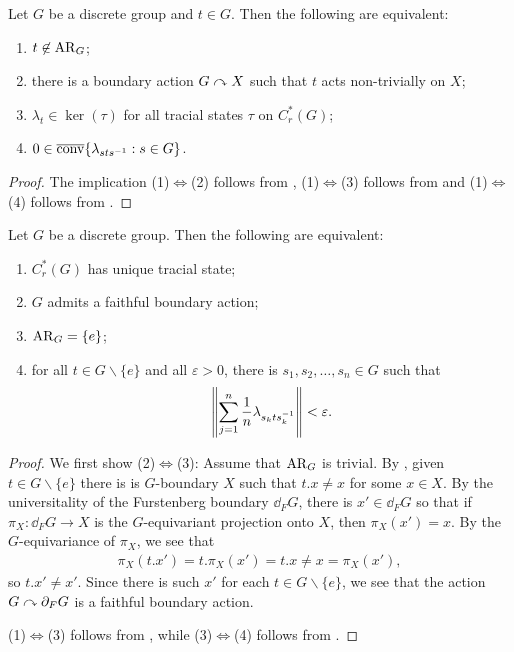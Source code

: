 \begin{theorem}
Let $G$ be a discrete group and $t \in G$. Then the following are equivalent:
\begin{enumerate}
\item $t \not\in \operatorname{AR}_G$;
\item there is a boundary action $G \curvearrowright X$ such that $t$ acts non-trivially on $X$;
\item $\lambda_t \in \ker(\tau)$ for all tracial states $\tau$ on $C_r^*(G)$;
\item $0 \in \overline{\operatorname{conv}}\{\lambda_{sts^{-1}} : s \in G \}$.
\end{enumerate}
\begin{proof}
The implication (1)$\Leftrightarrow$(2) follows from , (1)$\Leftrightarrow$(3) follows from  and (1)$\Leftrightarrow$(4) follows from .
\end{proof}
\end{theorem}

\begin{theorem}\label{trace unique arg triv}
Let $G$ be a discrete group. Then the following are equivalent:
\begin{enumerate}
\item $C_r^*(G)$ has unique tracial state;
\item $G$ admits a faithful boundary action;
\item $\operatorname{AR}_G = \{ e \}$;
\item for all $t \in G \backslash \{e\}$ and all $\varepsilon>0$, there is $s_1,s_2,\dots,s_n \in G$ such that
\begin{align*}
\left\lVert \sum_{j=1}^n \frac{1}{n} \lambda_{s_k t s_k ^{-1}} \right\rVert < \varepsilon.
\end{align*}
\end{enumerate}
\begin{proof}
We first show (2)$\Leftrightarrow$(3): Assume that $\operatorname{AR}_G$ is trivial. By , given $t \in G\backslash \{e\}$ there is is $G$-boundary $X$ such that $t.x \neq x$ for some $x \in X$. By the universitality of the Furstenberg boundary $\dd_F G$, there is $x' \in \dd_F G$ so that if $\pi_X \colon \dd_F G \to X$ is the $G$-equivariant projection onto $X$, then $\pi_X(x')=x$. By the $G$-equivariance of $\pi_X$, we see that
\begin{align*}
\pi_X(t.x')=t.\pi_X(x') =t. x \neq x = \pi_X (x'),
\end{align*}
so $t.x' \neq x'$. Since there is such $x'$ for each $t \in G \backslash\{e \}$, we see that the action $G \curvearrowright \partial_F G$ is a faithful boundary action.

\noindent (1)$\Leftrightarrow$(3) follows from , while (3)$\Leftrightarrow$(4) follows from .
\end{proof}
\end{theorem}

